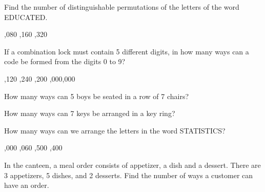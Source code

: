 \begin{questions}
\question Find the number of distinguishable permutations of the letters of the word EDUCATED. 
\begin{multicols}{4}
\begin{choices} 
,080
,160 
,320 
\end{choices}
\end{multicols}

\question If a combination lock must contain 5 different digits, in how many ways can a code be formed from the digits 0 to 9? 
\begin{multicols}{4}
\begin{choices} 
,120
,240
,200
,000,000
\end{choices}
\end{multicols}

\question How many ways can 5 boys be seated in a row of 7 chairs? 
\begin{multicols}{4}
\begin{choices} 
\end{choices}
\end{multicols}

\question How many ways can 7 keys be arranged in a key ring?
\begin{multicols}{4}
\begin{choices} 
\end{choices}
\end{multicols}

\question How many ways can we arrange the letters in the word STATISTICS?
\begin{multicols}{4}
\begin{choices} 
,000
,060
,500 
,400
\end{choices}
\end{multicols}

\question In the canteen, a meal order consists of appetizer, a dish and a dessert. There are 3 appetizers, 5 dishes, and 2 desserts. Find the number of ways a customer can have an order.
\begin{multicols}{4}
\begin{choices} 
\end{choices}
\end{multicols}


\end{questions}
